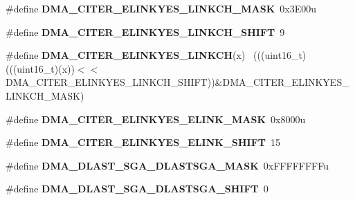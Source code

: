 \begin{DoxyCompactItemize}
\item 
\hypertarget{group___d_m_a___register___masks_ga2cd979a0efa9045304d49655f57747ef}{}\#define {\bfseries D\+M\+A\+\_\+\+C\+I\+T\+E\+R\+\_\+\+E\+L\+I\+N\+K\+Y\+E\+S\+\_\+\+L\+I\+N\+K\+C\+H\+\_\+\+M\+A\+S\+K}~0x3\+E00u\label{group___d_m_a___register___masks_ga2cd979a0efa9045304d49655f57747ef}

\item 
\hypertarget{group___d_m_a___register___masks_ga2c85ee95c023b3a2705bc1b393d8261e}{}\#define {\bfseries D\+M\+A\+\_\+\+C\+I\+T\+E\+R\+\_\+\+E\+L\+I\+N\+K\+Y\+E\+S\+\_\+\+L\+I\+N\+K\+C\+H\+\_\+\+S\+H\+I\+F\+T}~9\label{group___d_m_a___register___masks_ga2c85ee95c023b3a2705bc1b393d8261e}

\item 
\hypertarget{group___d_m_a___register___masks_gabf061b1466318ec5f284c26cf143aece}{}\#define {\bfseries D\+M\+A\+\_\+\+C\+I\+T\+E\+R\+\_\+\+E\+L\+I\+N\+K\+Y\+E\+S\+\_\+\+L\+I\+N\+K\+C\+H}(x)                      ~(((uint16\+\_\+t)(((uint16\+\_\+t)(x))$<$$<$D\+M\+A\+\_\+\+C\+I\+T\+E\+R\+\_\+\+E\+L\+I\+N\+K\+Y\+E\+S\+\_\+\+L\+I\+N\+K\+C\+H\+\_\+\+S\+H\+I\+F\+T))\&D\+M\+A\+\_\+\+C\+I\+T\+E\+R\+\_\+\+E\+L\+I\+N\+K\+Y\+E\+S\+\_\+\+L\+I\+N\+K\+C\+H\+\_\+\+M\+A\+S\+K)\label{group___d_m_a___register___masks_gabf061b1466318ec5f284c26cf143aece}

\item 
\hypertarget{group___d_m_a___register___masks_ga1f0a2f5fd8eaf8a52fcea91e57e48c11}{}\#define {\bfseries D\+M\+A\+\_\+\+C\+I\+T\+E\+R\+\_\+\+E\+L\+I\+N\+K\+Y\+E\+S\+\_\+\+E\+L\+I\+N\+K\+\_\+\+M\+A\+S\+K}~0x8000u\label{group___d_m_a___register___masks_ga1f0a2f5fd8eaf8a52fcea91e57e48c11}

\item 
\hypertarget{group___d_m_a___register___masks_ga8934a876cf4971db85286742f46b1ddb}{}\#define {\bfseries D\+M\+A\+\_\+\+C\+I\+T\+E\+R\+\_\+\+E\+L\+I\+N\+K\+Y\+E\+S\+\_\+\+E\+L\+I\+N\+K\+\_\+\+S\+H\+I\+F\+T}~15\label{group___d_m_a___register___masks_ga8934a876cf4971db85286742f46b1ddb}

\item 
\hypertarget{group___d_m_a___register___masks_gaf1fd5a37254e4699b6c8a52601ae30d9}{}\#define {\bfseries D\+M\+A\+\_\+\+D\+L\+A\+S\+T\+\_\+\+S\+G\+A\+\_\+\+D\+L\+A\+S\+T\+S\+G\+A\+\_\+\+M\+A\+S\+K}~0x\+F\+F\+F\+F\+F\+F\+F\+Fu\label{group___d_m_a___register___masks_gaf1fd5a37254e4699b6c8a52601ae30d9}

\item 
\hypertarget{group___d_m_a___register___masks_gac7f56cf638102a09cb466aaa5b477a3d}{}\#define {\bfseries D\+M\+A\+\_\+\+D\+L\+A\+S\+T\+\_\+\+S\+G\+A\+\_\+\+D\+L\+A\+S\+T\+S\+G\+A\+\_\+\+S\+H\+I\+F\+T}~0\label{group___d_m_a___register___masks_gac7f56cf638102a09cb466aaa5b477a3d}


\end{DoxyCompactItemize}
